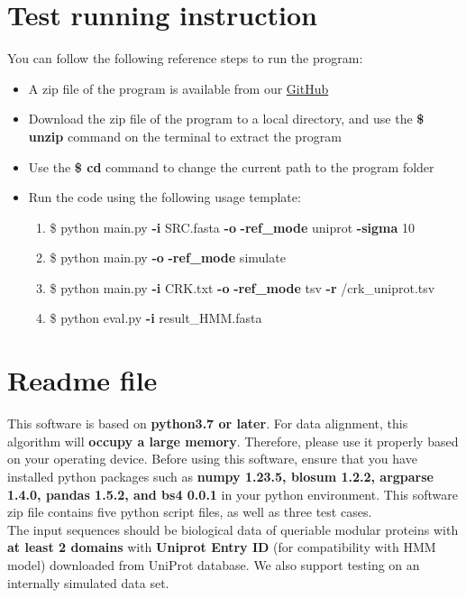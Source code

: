 \documentclass{article}
\begin{document}
\section{Test running instruction}

You can follow the following reference steps to run the program:
\begin{itemize}
\item A zip file of the program is available from our \href{https://github.com/Yifei-Shang42/BMI3_domain_aware_aligner/blob/main/BMI3_domain_aware_aligner.zip}{GitHub}
\item Download the zip file of the program to a local directory, and use the \textbf{\$ unzip} command on the terminal to extract the program
\item Use the \textbf{\$ cd} command to change the current path to the program folder
\item Run the code using the following usage template:
\begin{enumerate}
\item \$ python main.py \textbf{-i} SRC.fasta \textbf{-o} \textbf{-ref\_mode} uniprot \textbf{-sigma} 10
\item \$ python main.py  \textbf{-o} \textbf{-ref\_mode} simulate
\item \$ python main.py \textbf{-i} CRK.txt \textbf{-o} \textbf{-ref\_mode} tsv \textbf{-r} /crk\_uniprot.tsv
\item \$ python eval.py \textbf{-i} result\_HMM.fasta
\end{enumerate}
\end{itemize}

\section{Readme file}

This software is based on \textbf{python3.7 or later}. For data alignment, this algorithm will \textbf{occupy a large memory}. Therefore, please use it properly based on your operating device. Before using this software, {ensure that you have installed python packages} such as \textbf{numpy 1.23.5, blosum 1.2.2, argparse 1.4.0, pandas 1.5.2, and bs4 0.0.1} in your python environment.
This software zip file contains five python script files, as well as three test cases.\\

\noindent The input sequences should be biological data of queriable modular proteins with \textbf{at least 2 domains} with \textbf{Uniprot Entry ID} (for compatibility with HMM model) downloaded from UniProt database. We also support testing on an internally simulated data set.\\
\end{document}
